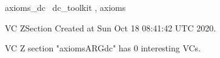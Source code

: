 \documentclass{article}
\begin{document}

\begin{zsection}	 \SECTION axioms\_dc \parents~dc\_toolkit , axioms
\end{zsection}

\newcommand{\appliesTo}{\zbinop{appliesTo}} 
\newcommand{\appliesToNofix}{\zpreop{appliesToNofix}} 

VC ZSection Created at Sun Oct 18 08:41:42 UTC 2020.



 VC Z section "axiomsARGdc" has $0$ interesting VCs.



\end{document}
